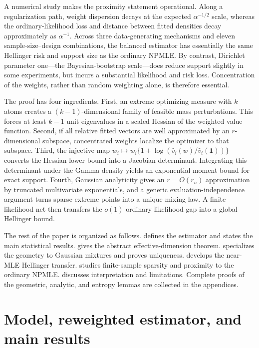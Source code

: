 \documentclass[11pt]{article}
\theoremstyle{definition}
\theoremstyle{remark}
\newcommand{\one}{\bm 1}
\newcommand{\vhat}{\widehat v}
\begin{document}
A numerical study makes the proximity statement operational.  Along a
regularization path, weight dispersion decays at the expected
$\alpha^{-1/2}$ scale, whereas the ordinary-likelihood loss and distance
between fitted densities decay approximately as $\alpha^{-1}$.  Across
three data-generating mechanisms and eleven sample-size--design combinations,
the balanced estimator has essentially the same Hellinger risk and support
size as the ordinary NPMLE.  By contrast, Dirichlet parameter one---the
Bayesian-bootstrap scale---does reduce support slightly in some experiments,
but incurs a substantial likelihood and risk loss.  Concentration of the
weights, rather than random weighting alone, is therefore essential.

The proof has four ingredients.  First, an extreme optimizing measure with
$k$ atoms creates a $(k-1)$-dimensional family of feasible mass perturbations.
This forces at least $k-1$ unit eigenvalues in a scaled Hessian of the weighted
value function.  Second, if all relative fitted vectors are well approximated
by an $r$-dimensional subspace, concentrated weights localize the optimizer to
that subspace.  Third, the injective map
$w_i\mapsto w_i\{1+\log(\vhat_i(w)/\vhat_i(\one))\}$ converts the Hessian
lower bound into a Jacobian determinant.  Integrating this determinant under
the Gamma density yields an exponential moment bound for exact support.
Fourth, Gaussian analyticity gives an $r=O(r_n)$ approximation by truncated
multivariate exponentials, and a generic evaluation-independence argument
turns sparse extreme points into a unique mixing law.  A finite likelihood
net then transfers the $o(1)$ ordinary likelihood gap into a global Hellinger
bound.

The rest of the paper is organized as follows.   defines the
estimator and states the main statistical results.  
gives the abstract effective-dimension theorem.  
specializes the geometry to Gaussian mixtures and proves uniqueness.
 develops the near-MLE Hellinger transfer.
 studies finite-sample sparsity and proximity to the
ordinary NPMLE.   discusses interpretation and
limitations.  Complete proofs of the geometric, analytic, and entropy lemmas
are collected in the appendices.

\section{Model, reweighted estimator, and main results}\label{sec:model}
\end{document}
